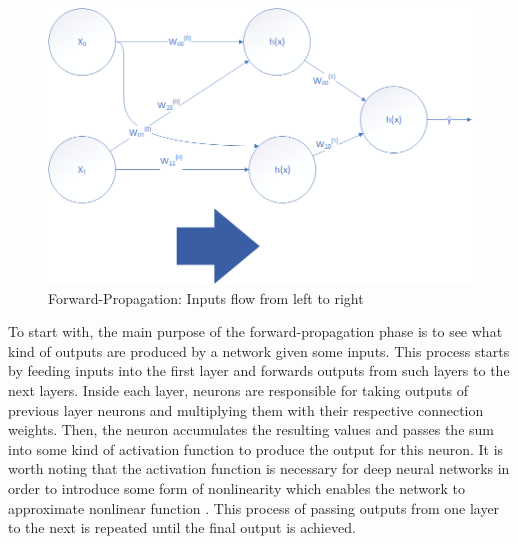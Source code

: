\documentclass[conference]{IEEEtran}
\begin{document}
        \begin{figure}[!htb]
            \centering
            \captionsetup{justification=centering}
            \includegraphics[width=\linewidth]{ForwardProp.png}
            \caption{Forward-Propagation: Inputs flow from left to right}  
        \end{figure}

        To start with, the main purpose of the forward-propagation phase is to see what kind of outputs are produced by a network given some inputs. This process starts by feeding inputs into the first layer and forwards outputs from such layers to the next layers. Inside each layer, neurons are responsible for taking outputs of previous layer neurons and multiplying them with their respective connection weights. Then, the neuron accumulates the resulting values and passes the sum into some kind of activation function to produce the output for this neuron. It is worth noting that the activation function is necessary for deep neural networks in order to introduce some form of nonlinearity which enables the network to approximate nonlinear function \cite{luhaniwal_2020}. This process of passing outputs from one layer to the next is repeated until the final output is achieved.
\end{document}
